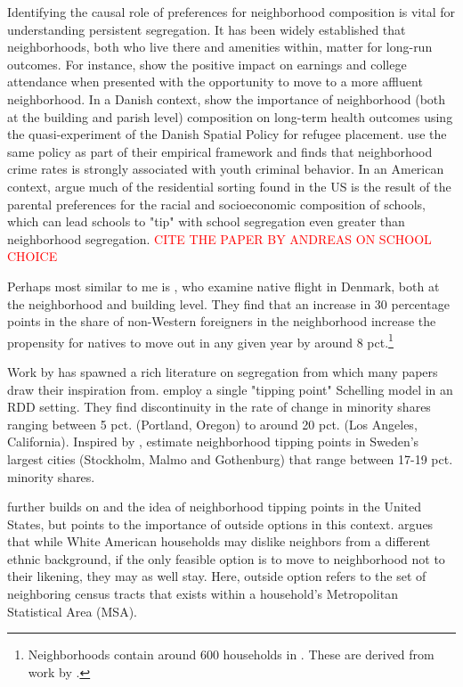 \documentclass[../main.tex]{subfiles}
\begin{document}
Identifying the causal role of preferences for neighborhood composition is vital for understanding persistent segregation. It has been widely established that neighborhoods, both who live there and amenities within, matter for long-run outcomes. For instance, \textcite{chetty2016effects} show the positive impact on earnings and college attendance when presented with the opportunity to move to a more affluent neighborhood. In a Danish context, \textcite{hasager2024sick_poor_neighborhood} show the importance of neighborhood (both at the building and parish level) composition on long-term health outcomes using the quasi-experiment of the Danish Spatial Policy for refugee placement. \textcite{damm2014crime} use the same policy as part of their empirical framework and finds that neighborhood crime rates is strongly associated with youth criminal behavior. In an American context, \textcite{caetano2017school} argue much of the residential sorting found in the US is the result of the parental preferences for the racial and socioeconomic composition of schools, which can lead schools to "tip" with school segregation even greater than neighborhood segregation. \textcolor{red}{CITE THE PAPER BY ANDREAS ON SCHOOL CHOICE} 

Perhaps most similar to me is \textcite{rockwool_boje2024immigrants}, who examine native flight in Denmark, both at the neighborhood and building level. They find that an increase in 30 percentage points in the share of non-Western foreigners in the neighborhood increase the propensity for natives to move out in any given year by around 8 pct.\footnote{Neighborhoods contain around 600 households in \textcite{rockwool_boje2024immigrants}. These are derived from work by \textcite{damm2008danish}.}

Work by \textcite{schelling1971dynamic} has spawned a rich literature on segregation from which many papers draw their inspiration from.  \textcite{card2008tipping} employ a single "tipping point" Schelling model in an RDD setting. They find discontinuity in the rate of change in minority shares ranging between 5 pct. (Portland, Oregon) to around 20 pct. (Los Angeles, California). Inspired by \textcite{card2008tipping},\textcite{bohlmark_willen_2020_tipping} estimate neighborhood tipping points in Sweden's largest cities (Stockholm, Malmo and Gothenburg) that range between 17-19 pct. minority shares.

\textcite{blair2017outside} further builds on \textcite{card2008tipping} and the idea of neighborhood tipping points in the United States, but points to the importance of outside options in this context. \textcite{blair2017outside} argues  that while White American households may dislike neighbors from a different ethnic background, if the only feasible option is to move to neighborhood not to their likening, they may as well stay. Here, outside option refers to the set of neighboring census tracts that exists within a household's Metropolitan Statistical Area (MSA). 
\end{document}
